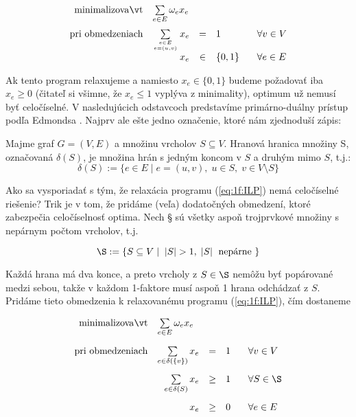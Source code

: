 \begin{equation}
  \label{eq:1f:ILP}
\begin{array}{rrcll}
  {\rm minimalizovať}     & \multicolumn{1}{l}{\sum\limits_{e\in E}\omega_ex_e}\\[3ex]
  {\rm pri\ obmedzeniach} &  \sum\limits_{e\in E\atop e=(u,v)} x_e &=&1& \;\;\;\forall v\in V\\
                          & x_e&\in&\{0,1\}& \;\;\;\forall e\in E\\
\end{array}
\end{equation}

\noindent
Ak tento program relaxujeme a namiesto $x_e\in\{0,1\}$ budeme požadovať iba $x_e\ge0$ 
(čitateľ si všimne, že $x_e\le1$ vyplýva z minimality), optimum už nemusí byť celočíselné. 
V nasledujúcich odstavcoch predstavíme primárno-duálny prístup podľa Edmondsa \cite{Edmonds65} .
Najprv ale ešte jedno označenie, ktoré nám zjednoduší zápis:

\begin{dfn}
  \label{dfn:edgeboundary}
Majme graf $G=(V,E)$ a množinu vrcholov $S\subseteq V$. Hranová hranica množiny S, označovaná $\delta(S)$, je množina hrán 
s jedným koncom v $S$ a druhým mimo $S$, t.j.:
$$\delta(S):=\{e\in E\mid e=(u,v),\;u\in S,\;v\in V\setminus S\}$$
\end{dfn}

\noindent
Ako sa vysporiadať s tým, že relaxácia programu (\ref{eq:1f:ILP}) nemá celočíselné riešenie? Trik je v tom,
že pridáme (veľa) dodatočných obmedzení, ktoré zabezpečia celočíselnosť optima. Nech \S
sú všetky aspoň trojprvkové 
množiny s nepárnym počtom vrcholov, t.j.

$$\S:=\left\{ S\subseteq V\mid\; |S|>1,\;|S|\;\text{\ nepárne\ }\right\}$$

\noindent
Každá hrana má dva konce, a preto vrcholy z $S\in\S$ nemôžu byť popárované medzi sebou, takže
v každom 1-faktore musí aspoň 1 hrana odchádzať z $S$. Pridáme tieto obmedzenia k relaxovanému programu
(\ref{eq:1f:ILP}),
čím dostaneme

\begin{equation}
  \label{eq:1f:P}
\begin{array}{rrcll}
  {\rm minimalizovať}     & \multicolumn{1}{l}{\sum\limits_{e\in E}\omega_ex_e}\\[4ex]
  {\rm pri\ obmedzeniach} &  \sum\limits_{e\in\delta(\{v\})} x_e &=&1& \;\;\;\forall v\in V\\[4ex]
                          & \sum\limits_{e\in\delta(S)}x_e&\ge&1&\;\;\;\forall S\in\S\\[4ex]
                          & x_e&\ge&0& \;\;\;\forall e\in E\\
\end{array}
\end{equation}

